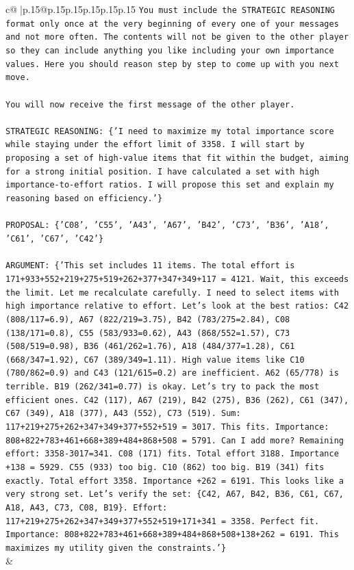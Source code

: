 \documentclass{article}
\begin{document}
{\begin{supertabular}{c@{$\;$}|p{.15\linewidth}@{}p{.15\linewidth}p{.15\linewidth}p{.15\linewidth}p{.15\linewidth}p{.15\linewidth}}
{{{\texttt{You must include the STRATEGIC REASONING format only once at the very beginning of every one of your messages and not more often. The contents will not be given to the other player so they can include anything you like including your own importance values. Here you should reason step by step to come up with you next move.} \\
\\ 
\texttt{You will now receive the first message of the other player.} \\
\\ 
\texttt{STRATEGIC REASONING: \{'I need to maximize my total importance score while staying under the effort limit of 3358. I will start by proposing a set of high{-}value items that fit within the budget, aiming for a strong initial position. I have calculated a set with high importance{-}to{-}effort ratios. I will propose this set and explain my reasoning based on efficiency.'\}} \\
\\ 
\texttt{PROPOSAL: \{'C08', 'C55', 'A43', 'A67', 'B42', 'C73', 'B36', 'A18', 'C61', 'C67', 'C42'\}} \\
\\ 
\texttt{ARGUMENT: \{'This set includes 11 items. The total effort is 171+933+552+219+275+519+262+377+347+349+117 = 4121. Wait, this exceeds the limit. Let me recalculate carefully. I need to select items with high importance relative to effort. Let's look at the best ratios: C42 (808/117=6.9), A67 (822/219=3.75), B42 (783/275=2.84), C08 (138/171=0.8), C55 (583/933=0.62), A43 (868/552=1.57), C73 (508/519=0.98), B36 (461/262=1.76), A18 (484/377=1.28), C61 (668/347=1.92), C67 (389/349=1.11). High value items like C10 (780/862=0.9) and C43 (121/615=0.2) are inefficient. A62 (65/778) is terrible. B19 (262/341=0.77) is okay. Let's try to pack the most efficient ones. C42 (117), A67 (219), B42 (275), B36 (262), C61 (347), C67 (349), A18 (377), A43 (552), C73 (519). Sum: 117+219+275+262+347+349+377+552+519 = 3017. This fits. Importance: 808+822+783+461+668+389+484+868+508 = 5791. Can I add more? Remaining effort: 3358{-}3017=341. C08 (171) fits. Total effort 3188. Importance +138 = 5929. C55 (933) too big. C10 (862) too big. B19 (341) fits exactly. Total effort 3358. Importance +262 = 6191. This looks like a very strong set. Let's verify the set: \{C42, A67, B42, B36, C61, C67, A18, A43, C73, C08, B19\}. Effort: 117+219+275+262+347+349+377+552+519+171+341 = 3358. Perfect fit. Importance: 808+822+783+461+668+389+484+868+508+138+262 = 6191. This maximizes my utility given the constraints.'\}} \\
            }
        }
    }
    & \\ \\


\end{supertabular}}
\end{document}
